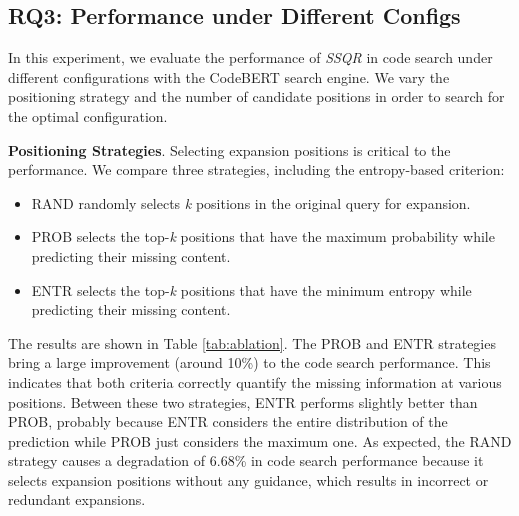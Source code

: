 \documentclass[sigconf,screen]{acmart}
\newcommand{\ourmethod}{\textit{SSQR}\xspace}
\begin{document}
\subsection{RQ3: Performance under Different Configs}

In this experiment, we evaluate the performance of \ourmethod in code search under different configurations with the CodeBERT search engine. We vary the positioning strategy and the number of candidate positions in order to search for the optimal configuration. 

\smallskip \textbf{Positioning Strategies}. 
Selecting expansion positions is critical to the performance. We compare three strategies, including the entropy-based criterion:
\begin{itemize}
\item RAND randomly selects \textit{k} positions in the original query for expansion.
\item PROB selects the top-\textit{k} positions that have  the maximum probability while predicting their missing content.
\item ENTR selects the top-\textit{k} positions that have the  minimum entropy while predicting their missing content.
\end{itemize}

The results are shown in Table \ref{tab:ablation}. The PROB and ENTR strategies bring a large improvement (around 10\%) to the code search performance. This indicates that both criteria correctly quantify the missing information at various positions. Between these two strategies, ENTR performs slightly better than PROB, probably because ENTR considers the entire distribution of the prediction while PROB just considers the maximum one. 
As expected, the RAND strategy causes a degradation of 6.68\% in code search performance because it selects expansion positions without any guidance, which results in incorrect or redundant expansions.



\end{document}
